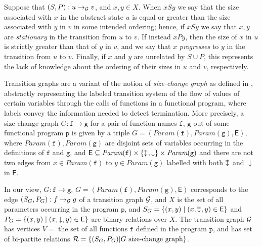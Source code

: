 Suppose that $(S,P) : u \to_{\mathcal{G}} v$, and $x, y \in X$. When $x S y$ we say that the size associated with $x$ in the abstract state $u$ is equal or greater than the size associated with $y$ in $v$ in some intended ordering; hence, if $x S y$ we say that 
$x,y$ are {\em stationary} in the transition from $u$ to $v$. If instead  $x P y$, then the size of $x$ in $u$ is strictly greater than that of $y$ in $v$, and 
we say that $x$ {\em progresses} to $y$ in the transition from $u$ to $v$. 
Finally, if $x$ and $y$ are unrelated by $S \cup P$, this
represents the lack of knowledge about the ordering of their sizes in $u$ and $v$, respectively.

\medskip
Transition graphs are a variant of the notion of {\em size-change graph} as defined in \cite[Def. 2.1]{Lee3}, abstractly representing the labeled transition system of the flow of values of certain variables through the calls of functions in a functional program, where labels convey the information needed to detect termination.
More precisely, a size-change graph $G:\texttt{f} \to \texttt{g}$ for a pair of function names $\texttt{f}$, 
$\texttt{g}$ out of some functional program $\texttt{p}$
is given by a triple $G = (\textit{Param}(\texttt{f}), \textit{Param}(\texttt{g}), \textsf{E})$, where $\textit{Param}(\texttt{f}), \textit{Param}(\texttt{g})$
are disjoint sets of variables occurring in the definitions of $\texttt{f}$ and $\texttt{g}$, and $\textsf{E} \subseteq \textit{Param}(\texttt{f}) \times \Set{\leqdownarrow, \downarrow} \times \textit{Param}(\texttt{g})$ and there are not two edges from $x \in \textit{Param}(\texttt{f})$ to
$y \in \textit{Param}(\texttt{g})$ labelled with both $\leqdownarrow$ and
$\downarrow$ in $\textsf{E}$.

In our view, $G:\texttt{f} \to \texttt{g}$, 
$G = (\textit{Param}(\texttt{f}), \textit{Param}(\texttt{g}), \textsf{E})$ corresponds 
to the edge $(S_G,P_G) : f \to_{\mathcal{G}} g$ of a transition graph $\mathcal{G}$, and
$X$ is the set of all parameters occurring in the program $\texttt{p}$, 
and $S_G = \Set{(x,y) \mid (x, \leqdownarrow, y) \in \textsf{E}}$ and 
$P_G = \{ (x,y) \mid (x, \downarrow, y) \in \textsf{E} \}$ are binary relations over $X$.
The transition graph $\mathcal{G}$ has vertices $V=$ the set of all functions $\texttt{f}$
defined in the program $\texttt{p}$, and has set of
bi-partite relations $\mathcal{R} = \{ (S_G,P_G) | G \mbox{ size-change graph} \}$.


